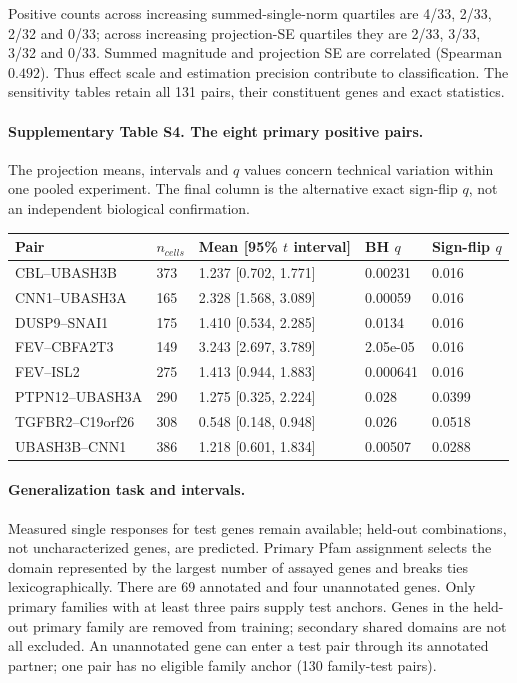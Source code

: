\documentclass[a4paper,fleqn]{cas-sc}
\makeatletter
\DeclareRobustCommand{\rev}[1]{{\color{red}\def\@citecolor{black}\def\@linkcolor{red}\def\@urlcolor{red}#1}}
\makeatother
\begin{document}
Positive counts across increasing summed-single-norm quartiles are 4/33, 2/33, 2/32 and 0/33; across increasing projection-SE quartiles they are 2/33, 3/33, 3/32 and 0/33. Summed magnitude and projection SE are correlated (Spearman $0.492$). Thus effect scale and estimation precision contribute to classification. The sensitivity tables retain all 131 pairs, their constituent genes and exact statistics.

\paragraph{Supplementary Table S4. The eight primary positive pairs.}
The projection means, intervals and $q$ values concern technical variation within one pooled experiment. The final column is the alternative exact sign-flip $q$, not an independent biological confirmation.
\begin{longtable}{p{}p{}p{}p{}p{}}
\toprule
\rev{Pair} & \rev{$n_{cells}$} & \rev{Mean [95\% $t$ interval]} & \rev{BH $q$} & \rev{Sign-flip $q$}\\
\midrule
\endhead
\rev{CBL--UBASH3B} & \rev{373} & \rev{1.237 [0.702, 1.771]} & \rev{0.00231} & \rev{0.016}\\
\rev{CNN1--UBASH3A} & \rev{165} & \rev{2.328 [1.568, 3.089]} & \rev{0.00059} & \rev{0.016}\\
\rev{DUSP9--SNAI1} & \rev{175} & \rev{1.410 [0.534, 2.285]} & \rev{0.0134} & \rev{0.016}\\
\rev{FEV--CBFA2T3} & \rev{149} & \rev{3.243 [2.697, 3.789]} & \rev{2.05e-05} & \rev{0.016}\\
\rev{FEV--ISL2} & \rev{275} & \rev{1.413 [0.944, 1.883]} & \rev{0.000641} & \rev{0.016}\\
\rev{PTPN12--UBASH3A} & \rev{290} & \rev{1.275 [0.325, 2.224]} & \rev{0.028} & \rev{0.0399}\\
\rev{TGFBR2--C19orf26} & \rev{308} & \rev{0.548 [0.148, 0.948]} & \rev{0.026} & \rev{0.0518}\\
\rev{UBASH3B--CNN1} & \rev{386} & \rev{1.218 [0.601, 1.834]} & \rev{0.00507} & \rev{0.0288}\\
\bottomrule
\end{longtable}
\paragraph{Generalization task and intervals.}
Measured single responses for test genes remain available; held-out combinations, not uncharacterized genes, are predicted. Primary Pfam assignment selects the domain represented by the largest number of assayed genes and breaks ties lexicographically. There are 69 annotated and four unannotated genes. Only primary families with at least three pairs supply test anchors. Genes in the held-out primary family are removed from training; secondary shared domains are not all excluded. An unannotated gene can enter a test pair through its annotated partner; one pair has no eligible family anchor (130 family-test pairs).
\end{document}
